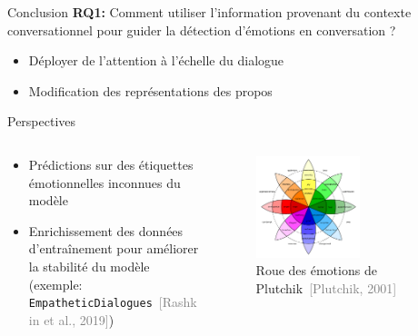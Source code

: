 \documentclass[11pt,aspectratio=169]{beamer}
\newcommand{\manualcite}[1]{\textcolor{gray}{\small[#1]}}
\begin{document}
\begin{frame}{Conclusion}
\textcolor{roose}{\bf RQ1:} Comment utiliser l'information provenant du contexte conversationnel pour guider la détection d'émotions en conversation ?
    \begin{itemize}
        \item Déployer de l'attention à l'échelle du dialogue
        \item Modification des représentations des propos
    \end{itemize}
\vspace{10pt}
\end{frame}

\begin{frame}{Perspectives}
    \begin{columns}
        \begin{column}[c]{0.4\linewidth}
            \begin{itemize}
                \item Prédictions sur des étiquettes émotionnelles inconnues du modèle
                \item Enrichissement des données d'entraînement pour améliorer la stabilité du modèle (exemple: \texttt{EmpatheticDialogues}~\manualcite{Rashkin et al., 2019}) 
            \end{itemize}
        \end{column}
        \begin{column}[c]{0.5\linewidth}
            \begin{figure}
                \centering
                \includegraphics[width=0.6\textwidth]{emotion_wheel.png}
                \caption{\centering Roue des émotions de Plutchik~\manualcite{Plutchik, 2001}}
            \end{figure}
        \end{column}
    \end{columns}
\end{frame}
\end{document}
